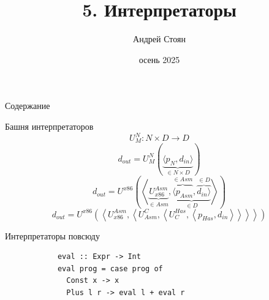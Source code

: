 
\newif\ifhandout



\newcommand{\iso}{\sim}

\title{5. Интерпретаторы}
\author{Андрей Стоян}

\date{осень 2025}



    \mymaketitle

    \begin{frame}[noframenumbering]{Содержание}
        \tableofcontents
    \end{frame}


    \begin{frame}[fragile]{Башня интерпретаторов}
        \pause
        \[U_M^N : N\times D\to D\]
        \pause
        \[d_{out} = U_M^N\left( \underbrace{\langle p_N, d_{in} \rangle}_{\in N\times D} \right)\]
        \pause
        \[
            d_{out} = U^{x86}\left(\left<\underbrace{U_{x86}^{Asm}}_{\in Asm}, \underbrace{\overbrace{\langle p_{Asm}}^{\in Asm}, \overbrace{d_{in} \rangle}^{\in D}}_{\in D} \right>\right)
        \]
        \pause
        \[
            d_{out} =
            U^{x86}\left(\left<
                             U_{x86}^{Asm}, \left<
                                                U^C_{Asm}, \left<
                                                               U^{Has}_C, \left< p_{Has}, d_{in}
                        \right>\right>\right>\right>\right)
        \]
    \end{frame}

    \begin{frame}[fragile]{Интерпретаторы повсюду}
        \pause
        \begin{verbatim}
            eval :: Expr -> Int
            eval prog = case prog of
              Const x -> x
              Plus l r -> eval l + eval r
        \end{verbatim}
    \end{frame}

